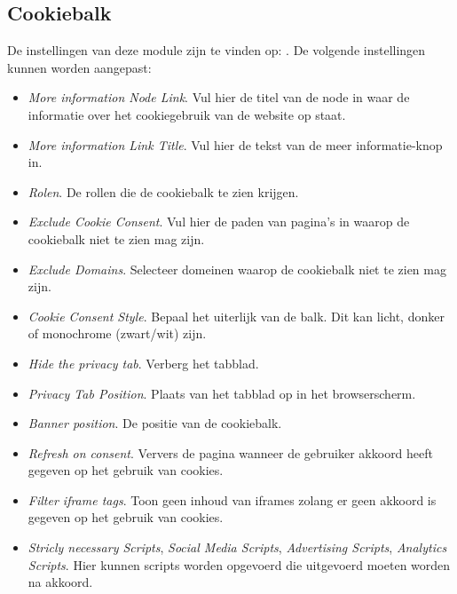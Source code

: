 \subsection{Cookiebalk}\label{cookiebalk}
De instellingen van deze module zijn te vinden op: . De volgende instellingen kunnen worden aangepast:

\begin{itemize}
\item \emph{More information Node Link}. Vul hier de titel van de node in waar de informatie over het cookiegebruik van de website op staat.
\item \emph{More information Link Title}. Vul hier de tekst van de meer informatie-knop in.
\item \emph{Rolen}. De rollen die de cookiebalk te zien krijgen.
\item \emph{Exclude Cookie Consent}. Vul hier de paden van pagina's in waarop de cookiebalk niet te zien mag zijn.
\item \emph{Exclude Domains}. Selecteer domeinen waarop de cookiebalk niet te zien mag zijn.
\item \emph{Cookie Consent Style}. Bepaal het uiterlijk van de balk. Dit kan licht, donker of monochrome (zwart/wit) zijn.
\item \emph{Hide the privacy tab}. Verberg het tabblad.
\item \emph{Privacy Tab Position}. Plaats van het tabblad op in het browserscherm.
\item \emph{Banner position}. De positie van de cookiebalk.
\item \emph{Refresh on consent}. Ververs de pagina wanneer de gebruiker akkoord heeft gegeven op het gebruik van cookies. 
\item \emph{Filter iframe tags}. Toon geen inhoud van iframes zolang er geen akkoord is gegeven op het gebruik van cookies.
\item \emph{Stricly necessary Scripts}, \emph{Social Media Scripts}, \emph{Advertising Scripts}, \emph{Analytics Scripts}. Hier kunnen scripts worden opgevoerd die uitgevoerd moeten worden na akkoord.
\end{itemize}